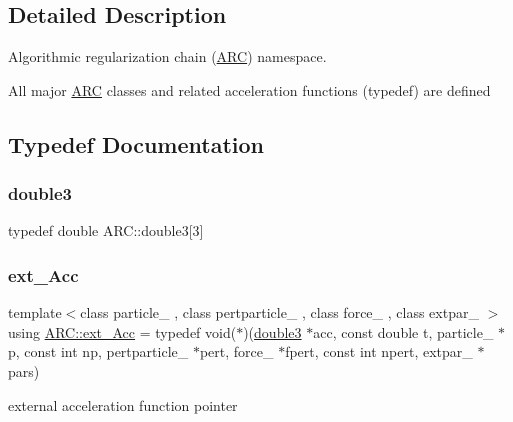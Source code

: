 \subsection{Detailed Description}
Algorithmic regularization chain (\hyperlink{namespaceARC}{A\+RC}) namespace. 

All major \hyperlink{namespaceARC}{A\+RC} classes and related acceleration functions (typedef) are defined 

\subsection{Typedef Documentation}
\hypertarget{namespaceARC_affb4fe085f3ea94b378be8bc9382a75d}{}\label{namespaceARC_affb4fe085f3ea94b378be8bc9382a75d} 
\subsubsection{\texorpdfstring{double3}{double3}}
{\footnotesize\ttfamily typedef double A\+R\+C\+::double3\mbox{[}3\mbox{]}}

\hypertarget{namespaceARC_aa423c7d6aff9481c040a20b3c5c6ff4e}{}\label{namespaceARC_aa423c7d6aff9481c040a20b3c5c6ff4e} 
\subsubsection{\texorpdfstring{ext\+\_\+\+Acc}{ext\_Acc}}
{\footnotesize\ttfamily template$<$class particle\+\_\+ , class pertparticle\+\_\+ , class force\+\_\+ , class extpar\+\_\+ $>$ \\
using \hyperlink{namespaceARC_aa423c7d6aff9481c040a20b3c5c6ff4e}{A\+R\+C\+::ext\+\_\+\+Acc} = typedef void($\ast$)(\hyperlink{namespaceARC_affb4fe085f3ea94b378be8bc9382a75d}{double3} $\ast$acc, const double t, particle\+\_\+ $\ast$p, const int np, pertparticle\+\_\+ $\ast$pert, force\+\_\+ $\ast$fpert, const int npert, extpar\+\_\+ $\ast$pars)}



external acceleration function pointer 

